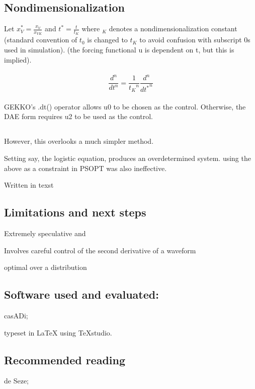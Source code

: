 \documentclass[fleqn,10pt]{paper}
\newcommand{\bstar}[1]{ {#1}^{\bm*} }
\begin{document}

\subsection*{Nondimensionalization}

Let $x_V^{\bm*} = \frac{x_V}{x_{VK}}$ and $t^{\bm*} = \frac{t}{t_{K}}$ where $_K$ denotes a nondimensionalization constant (standard convention of $t_0$ is changed to $t_K$ to avoid confusion with subscript 0s used in simulation). (the forcing functional u is dependent on t, but this is implied).\\ \\

$$\frac{d^n}{dt^n} = \frac{1}{{t_K}^n}\frac{d^n}{d{\bstar{t}}^n}$$\\







GEKKO's .dt() operator allows u0 to be chosen as the control. 
Otherwise, the DAE form requires u2 to be used as the control.







\subsection*{}


However, this overlooks a much simpler method.

Setting say, the logistic equation, produces an overdetermined system. using the above as a constraint in PSOPT was also ineffective.




Written in texst

\subsection*{Limitations and next steps}

Extremely speculative and 

Involves careful control of the second derivative of a waveform 

optimal over a distribution 



\subsection{Software used and evaluated:}

casADi;

typeset in LaTeX using TeXstudio.




\subsection{Recommended reading}

de Seze; 
\end{document}
